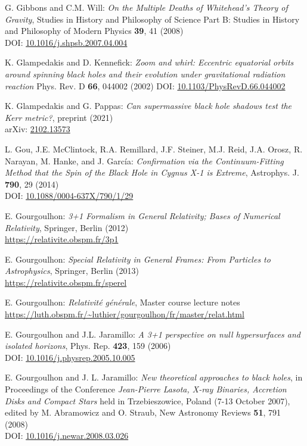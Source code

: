 \begin{thebibliography}{123}
G. Gibbons and C.M. Will: {\em On the Multiple Deaths of Whitehead's Theory of Gravity},
Studies in History and Philosophy of Science Part B: Studies in History and Philosophy of Modern Physics {\bf 39}, 41 (2008)\\
DOI: \href{https://doi.org/10.1016/j.shpsb.2007.04.004}{10.1016/j.shpsb.2007.04.004}

K. Glampedakis and D. Kennefick:
{\em Zoom and whirl: Eccentric equatorial orbits around spinning black holes and their evolution under gravitational radiation reaction}
Phys. Rev. D {\bf 66}, 044002 (2002)
DOI: \href{https://doi.org/10.1103/PhysRevD.66.044002}{10.1103/PhysRevD.66.044002}

K. Glampedakis and G. Pappas:
{\em Can supermassive black hole shadows test the Kerr metric?},
preprint (2021)\\
arXiv: \href{https://arxiv.org/abs/2102.13573}{2102.13573}

L. Gou, J.E. McClintock, R.A. Remillard, J.F. Steiner, M.J. Reid, J.A. Orosz, R. Narayan, M. Hanke, and J. García:
{\em Confirmation via the Continuum-Fitting Method that the Spin of the Black Hole in Cygnus X-1 is Extreme},
Astrophys. J. {\bf 790}, 29 (2014)\\
DOI: \href{https://doi.org/10.1088/0004-637X/790/1/29}{10.1088/0004-637X/790/1/29}

E. Gourgoulhon: {\em 3+1 Formalism in General Relativity; Bases of Numerical Relativity},
Springer, Berlin (2012)\\
\url{https://relativite.obspm.fr/3p1}

E. Gourgoulhon: {\em Special Relativity in General Frames: From Particles to Astrophysics},
Springer, Berlin (2013) \\
\url{https://relativite.obspm.fr/sperel}

E. Gourgoulhon: {\em Relativit\'e g\'en\'erale},
Master course lecture notes\\
\url{https://luth.obspm.fr/~luthier/gourgoulhon/fr/master/relat.html}

E. Gourgoulhon and J.L. Jaramillo: {\em A 3+1 perspective on null hypersurfaces and isolated horizons},
Phys. Rep. {\bf 423}, 159 (2006)\\
DOI: \href{https://doi.org/10.1016/j.physrep.2005.10.005}{10.1016/j.physrep.2005.10.005}

E. Gourgoulhon and J. L. Jaramillo: {\em New theoretical approaches to black holes},
in Proceedings of the Conference {\em Jean-Pierre Lasota, X-ray Binaries, Accretion Disks and Compact Stars} held in Trzebieszowice, Poland (7-13 October 2007), edited by M. Abramowicz and O. Straub, New Astronomy Reviews {\bf 51}, 791 (2008) \\
DOI: \href{https://doi.org/10.1016/j.newar.2008.03.026}{10.1016/j.newar.2008.03.026}


\end{thebibliography}
